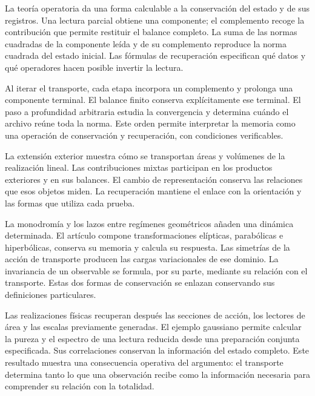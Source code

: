 
La teoría operatoria da una forma calculable a la conservación del
estado y de sus registros. Una lectura parcial obtiene una componente;
el complemento recoge la contribución que permite restituir el
balance completo. La suma de las normas cuadradas de la componente leída
y de su complemento reproduce la norma cuadrada del estado inicial.
Las fórmulas de recuperación especifican qué
datos y qué operadores hacen posible invertir la lectura.

Al iterar el transporte, cada etapa incorpora un complemento y
prolonga una componente terminal. El balance finito conserva
explícitamente ese terminal. El paso a profundidad arbitraria
estudia la convergencia y determina cuándo el archivo reúne toda la
norma. Este orden permite interpretar la memoria como una operación
de conservación y recuperación, con condiciones verificables.

La extensión exterior muestra cómo se transportan áreas y volúmenes
de la realización lineal. Las contribuciones mixtas participan en
los productos exteriores y en sus balances. El cambio de
representación conserva las relaciones que esos objetos miden.
La recuperación mantiene el enlace con la orientación y las formas
que utiliza cada prueba.

La monodromía y los lazos entre regímenes geométricos añaden una
dinámica determinada. El artículo compone transformaciones elípticas,
parabólicas e hiperbólicas, conserva su memoria y calcula su
respuesta. Las simetrías de la acción de transporte producen las
cargas variacionales de ese dominio. La invariancia de un observable
se formula, por su parte, mediante su relación con el transporte.
Estas dos formas de conservación se enlazan conservando sus
definiciones particulares.

Las realizaciones físicas recuperan después las secciones de acción,
los lectores de área y las escalas previamente generadas. El ejemplo
gaussiano permite calcular la pureza y el espectro de una lectura
reducida desde una preparación conjunta especificada. Sus
correlaciones conservan la información del estado completo. Este
resultado muestra una consecuencia operativa del argumento: el
transporte determina tanto lo que una observación recibe como la
información necesaria para comprender su relación con la totalidad.
